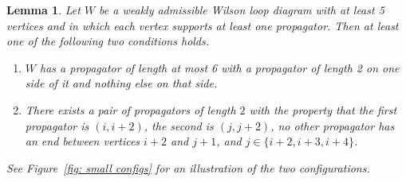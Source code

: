 \documentclass[11pt]{article}
\newtheorem{lem}[thm]{Lemma}
\theoremstyle{remark}
\theoremstyle{definition}
\begin{document}
\begin{lem}\label{lem sian}
  Let $W$ be a weakly admissible Wilson loop diagram with at least 5 vertices and in which each vertex supports at least one propagator.  Then at least one of the following two conditions holds.
  \vspace{-0.5em}
  \begin{enumerate}
    \item $W$ has a propagator of length at most 6 with a propagator of length 2 on one side of it and nothing else on that side.\label{item big and 2} 
    \item There exists a pair of propagators of length $2$ with the property that the first propagator is $(i, i+2)$, the second is $(j, j+2)$, no other propagator has an end between vertices $i+2$ and $j+1$, and $j\in\{i+2, i+3, i+4\}$.\label{item pair of 2s}
  \end{enumerate}
See Figure~\ref{fig: small configs} for an illustration of the two configurations.
\end{lem}
\end{document}
